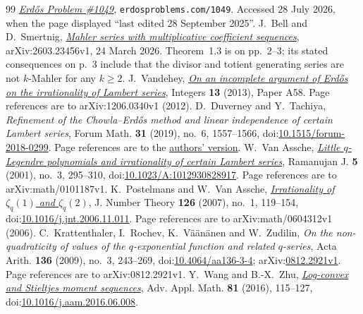 \documentclass[11pt]{article}
\begin{document}
\begin{thebibliography}{99}
  \href{https://www.erdosproblems.com/1049}{\emph{Erd\H{o}s Problem \#1049}},
  \texttt{erdosproblems.com/1049}. Accessed 28 July 2026, when the page
  displayed ``last edited 28 September 2025''.
 J.~Bell and D.~Smertnig,
  \href{https://arxiv.org/abs/2603.23456v1}{\emph{Mahler series with
  multiplicative coefficient sequences}}, arXiv:2603.23456v1,
  24 March 2026.  Theorem~1.3 is on pp.~2--3; its stated consequences on
  p.~3 include that the divisor and totient generating series are not
  $k$-Mahler for any $k\ge2$.
 J.~Vandehey,
  \href{https://arxiv.org/abs/1206.0340v1}{\emph{On an incomplete argument of
  Erd\H{o}s on the irrationality of Lambert series}}, Integers
  \textbf{13} (2013), Paper A58. Page references are to
  arXiv:1206.0340v1 (2012).
 D.~Duverney and Y.~Tachiya, \emph{Refinement of
  the Chowla--Erd\H{o}s method and linear independence of certain Lambert
  series}, Forum Math. \textbf{31} (2019), no.~6, 1557--1566,
  doi:\href{https://doi.org/10.1515/forum-2018-0299}{10.1515/forum-2018-0299}.
  Page references are to the
  \href{https://danielduverney.fr/documents/theorie-des-nombres/DuverneyTachiya190522.pdf}{authors'
  version}.
 W.~Van Assche,
  \href{https://arxiv.org/abs/math/0101187v1}{\emph{Little \(q\)-Legendre
  polynomials and irrationality of certain Lambert series}},
  Ramanujan J. \textbf{5} (2001), no.~3, 295--310,
  doi:\href{https://doi.org/10.1023/A:1012930828917}{10.1023/A:1012930828917}.
  Page references are to arXiv:math/0101187v1.
 K.~Postelmans and W.~Van Assche,
  \href{https://arxiv.org/abs/math/0604312v1}{\emph{Irrationality of
  $\zeta_q(1)$ and $\zeta_q(2)$}}, J. Number Theory \textbf{126} (2007),
  no.~1, 119--154,
  doi:\href{https://doi.org/10.1016/j.jnt.2006.11.011}{10.1016/j.jnt.2006.11.011}.
  Page references are to arXiv:math/0604312v1 (2006).
 C.~Krattenthaler, I.~Rochev, K.~V\"a\"an\"anen and
  W.~Zudilin, \emph{On the non-quadraticity of values of the
  \(q\)-exponential function and related \(q\)-series}, Acta Arith.
  \textbf{136} (2009), no.~3, 243--269,
  doi:\href{https://doi.org/10.4064/aa136-3-4}{10.4064/aa136-3-4};
  arXiv:\href{https://arxiv.org/abs/0812.2921v1}{0812.2921v1}.
  Page references are to arXiv:0812.2921v1.
 Y.~Wang and B.-X.~Zhu,
  \href{https://arxiv.org/abs/1612.04114v1}{\emph{Log-convex and Stieltjes
  moment sequences}}, Adv. Appl. Math. \textbf{81} (2016), 115--127,
  doi:\href{https://doi.org/10.1016/j.aam.2016.06.008}{10.1016/j.aam.2016.06.008}.

\end{thebibliography}
\end{document}
